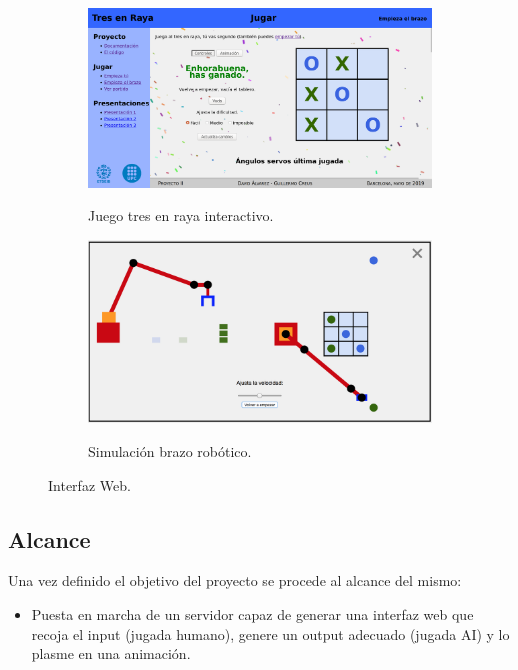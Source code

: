 \documentclass[11pt]{article}
\begin{document}
\begin{figure}[htbp]
  \centering
  \begin{subfigure}{.5\textwidth}
    \centering
    \href{https://alvarezrosa.com/proyecto/}{\includegraphics[width=.9\textwidth]{Interfaz_web.png}}
    \caption{Juego tres en raya interactivo.}
    \label{fig:sub1}
  \end{subfigure}%
  \begin{subfigure}{.5\textwidth}
    \centering
    \href{https://alvarezrosa.com/proyecto/}{\includegraphics[width=.9\textwidth]{Animacion.png}}
    \caption{Simulación brazo robótico.}
    \label{fig:sub2}
  \end{subfigure}
  \caption{Interfaz Web.}
  \label{fig:test}
\end{figure}

\subsection{Alcance}
Una vez definido el objetivo del proyecto se procede al alcance del mismo:

\begin{itemize}
  \item Puesta en marcha de un servidor capaz de generar una interfaz web que
  recoja el input (jugada humano), genere un output adecuado (jugada AI) y lo
  plasme en una animación.
\end{itemize}
\end{document}
